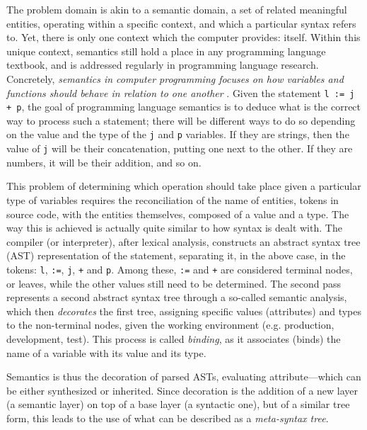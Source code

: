 The problem domain is akin to a semantic domain, a set of related meaningful entities, operating within a specific context, and which a particular syntax refers to. Yet, there is only one context which the computer provides: itself. Within this unique context, semantics still hold a place in any programming language textbook, and is addressed regularly in programming language research. Concretely, \emph{semantics in computer programming focuses on how variables and functions should behave in relation to one another} \citep{sethi_programming_1996}. Given the statement \lstinline{l := j + p}, the goal of programming language semantics is to deduce what is the correct way to process such a statement; there will be different ways to do so depending on the value and the type of the \lstinline{j} and \lstinline{p} variables. If they are strings, then the value of \lstinline{j} will be their concatenation, putting one next to the other. If they are numbers, it will be their addition, and so on.

This problem of determining which operation should take place given a particular type of variables requires the reconciliation of the name of entities, tokens in source code, with the entities themselves, composed of a value and a type. The way this is achieved is actually quite similar to how syntax is dealt with. The compiler (or interpreter), after lexical analysis, constructs an abstract syntax tree (AST) representation of the statement, separating it, in the above case, in the tokens: \lstinline{l}, \lstinline{:=}, \lstinline{j}, \lstinline{+} and \lstinline{p}. Among these, \lstinline{:=} and \lstinline{+} are considered terminal nodes, or leaves, while the other values still need to be determined. The second pass represents a second abstract syntax tree through a so-called semantic analysis, which then \emph{decorates} the first tree, assigning specific values (attributes) and types to the non-terminal nodes, given the working environment (e.g. production, development, test). This process is called \emph{binding}, as it associates (binds) the name of a variable with its value and its type.

Semantics is thus the decoration of parsed ASTs, evaluating attribute—which can be either synthesized or inherited. Since decoration is the addition of a new layer (a semantic layer) on top of a base layer (a syntactic one), but of a similar tree form, this leads to the use of what can be described as a \emph{meta-syntax tree}.

